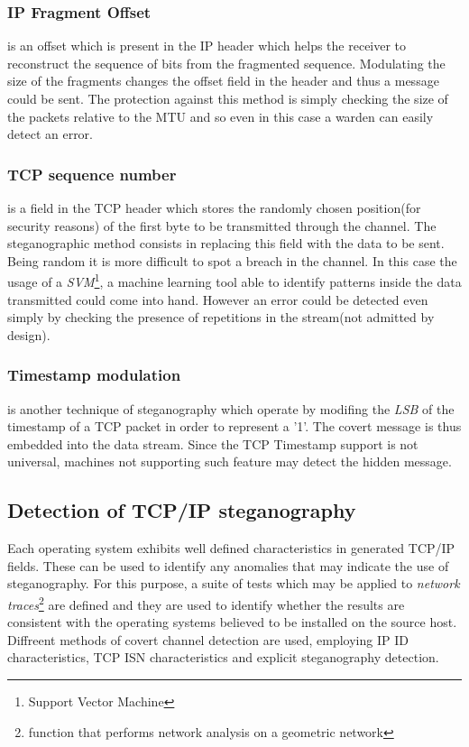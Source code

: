 \documentclass[../../main.tex]{subfiles}
\begin{document}
\subsubsection{IP Fragment Offset} is an offset which is present in the IP
header which helps the receiver to reconstruct the sequence of bits from the
fragmented sequence.
Modulating the size of the fragments changes the offset field in the header
and thus a message could be sent.
The protection against this method is simply checking the size of the
packets relative to the MTU and so even in this case a warden can easily
detect an error.

\subsubsection{TCP sequence number} is a field in the TCP header which stores
the randomly chosen position(for security reasons) of the first byte to be
transmitted through the channel. The steganographic method consists in
replacing this field with the data to be sent.
Being random it is more difficult to spot a breach in the channel.
In this case the usage of a \emph{SVM}\footnote{Support Vector Machine}, a
machine learning tool able to identify patterns inside the data transmitted
could come into hand.
However an error could be detected even simply by checking the presence of
repetitions in the stream(not admitted by design). 

\subsubsection{Timestamp modulation} is another technique of steganography which
operate by modifing the \emph{LSB} of the
timestamp of a TCP packet in order to represent a '1'.
The covert message is thus embedded into the data stream.
Since the TCP Timestamp support is not universal, machines not supporting
such feature may detect the hidden message.


\subsection{Detection of TCP/IP steganography}

Each operating system exhibits well defined characteristics in generated
TCP/IP fields. These can be used to identify any anomalies that may indicate 
the use of steganography. For this purpose, a suite of tests which may be
applied to \emph{network traces}\footnote{function that performs network
analysis on a geometric network} are defined and they are used to identify
whether the results are consistent with the operating systems believed to be
installed on the source host.
Diffreent methods of covert channel detection are used, employing IP ID 
characteristics, TCP ISN characteristics and explicit steganography
detection.
\end{document}
